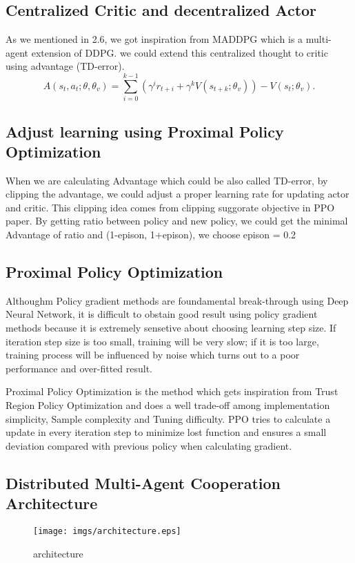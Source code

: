\documentclass[11pt,twocolumn]{jarticle} %
\begin{document}
\subsection{Centralized Critic and decentralized Actor}
As we mentioned in 2.6, we got inspiration from MADDPG which is a multi-agent extension of DDPG. we could extend this centralized thought to critic using advantage (TD-error).
\begin{equation}
A(s_t, a_t; \theta, \theta_v) = \sum_{i=0}^{k-1}(\gamma^i r_{t+i} + \gamma^k V(s_{t+k};\theta_v)) - V(s_t; \theta_v).
\end{equation}
\subsection{Adjust learning using Proximal Policy Optimization}
When we are calculating Advantage which could be also called TD-error, by clipping the advantage, we could adjust a proper learning rate for updating actor and critic. This clipping idea comes from clipping suggorate objective in PPO paper. By getting ratio between policy and new policy, we could get the minimal Advantage of ratio and (1-epison, 1+epison), we choose epison = 0.2

\subsection{Proximal Policy Optimization}
Althoughm Policy gradient methods are foundamental break-through using Deep Neural Network, it is difficult to obstain good result using policy gradient methods because it is extremely sensetive about choosing learning step size. If iteration step size is too small, training will be very slow; if it is too large, training process will be influenced by noise which turns out to a poor performance and over-fitted result. \par
Proximal Policy Optimization is the method which gets inspiration from Trust Region Policy Optimization and does a well trade-off among implementation simplicity, Sample complexity and Tuning difficulty. PPO tries to calculate a update in every iteration step to minimize lost function and ensures a small deviation compared with previous policy when calculating gradient.

\subsection{Distributed Multi-Agent Cooperation Architecture}
\begin{figure*}[t]
 \begin{center}
  \texttt{[image: imgs/architecture.eps]}
  \caption{architecture}
  \label{fig:architecture}
 \end{center}
\end{figure*}
\end{document}
